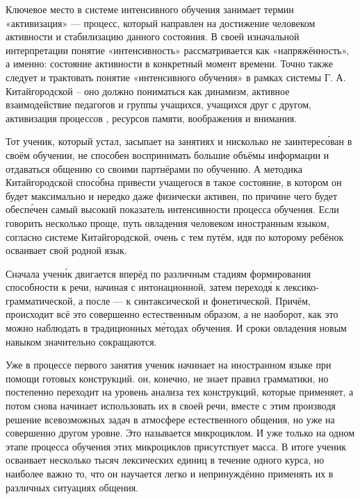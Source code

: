 Ключевое место в системе интенсивного обучения занимает термин «активизация» --- процесс, который направлен на достижение человеком активности и стабилизацию данного состояния. В своей изначальной интерпретации понятие «интенсивность» рассматривается как «напряжённость», а именно: состояние активности в конкретный момент времени. Точно также следует и трактовать понятие «интенсивного обучения» в рамках системы Г. А. Китайгородской – оно должно пониматься как динамизм, активное взаимодействие педагогов и группы учащихся, учащихся друг с другом, активизация процессов , ресурсов памяти, воображения и внимания.

Тот ученик, который устал, засыпает на занятиях и нисколько не заинтерес\'{о}ван в своём обучении, не способен  воспринимать большие объёмы информации и  отдаваться общению со своими партнёрами по обучению. А методика Китайгородской спос\'{о}бна привести учащегося в такое состояние, в котором он будет максимально  и нередко даже физически активен, по причине чего будет обесп\'{е}чен самый высокий показатель интенсивности процесса обучения. Если говорить несколько проще, путь овладения человеком иностранным языком, согласно системе Китайгородской, очень  с тем путём, идя по которому ребёнок осваивает свой родной язык.

Сначала учен\'{и}к двигается вперёд по различным стадиям формирования способности к речи, начиная с интонационной, затем переход\'{я} к лексико-грамматической, а после --- к синтаксической и фонетической. Причём, происходит всё это совершенно естественным образом, а не наоборот, как это можно наблюдать в традиционных м\'{е}тодах обучения. И сроки овладения новым навыком значительно сокращаются.

Уже в процессе первого занятия ученик начинает  на иностранном языке при помощи готовых конструкций.  он, конечно, не знает правил грамматики, но постепенно переходит на уровень анализа тех конструкций, которые применяет, а потом снова начинает использовать их в своей речи, вместе с этим производя решение всевозможных задач в атмосфере естественного общения, но уже на совершенно другом уровне. Это называется микроциклом. И уже только на одном этапе процесса обучения этих микроциклов присутствует масса. В итоге ученик осваивает несколько тысяч лексических единиц в течение одного курса, но наиболее важно то, что он научается легко и непринуждённо применять их в различных ситуациях общения.

